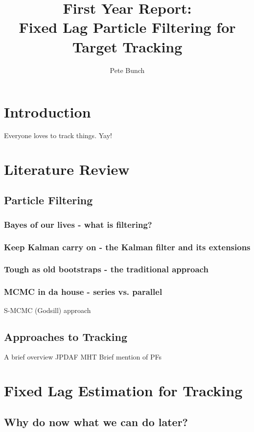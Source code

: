 \documentclass{RJWThesis}
\title{First Year Report: \\ Fixed Lag Particle Filtering for Target Tracking}
\author{Pete Bunch}
\begin{document}
\maketitle
\tableofcontents

\chapter{Introduction}
Everyone loves to track things. Yay! 

\chapter{Literature Review}
\section{Particle Filtering}
\subsection{Bayes of our lives - what is filtering?}


\subsection{Keep Kalman carry on - the Kalman filter and its extensions}


\subsection{Tough as old bootstraps - the traditional approach}


\subsection{MCMC in da house - series vs. parallel}
S-MCMC (Godsill) approach

\section{Approaches to Tracking}
A brief overview
JPDAF
MHT
Brief mention of PFs

\chapter{Fixed Lag Estimation for Tracking}
\section{Why do now what we can do later?}
\end{document}

